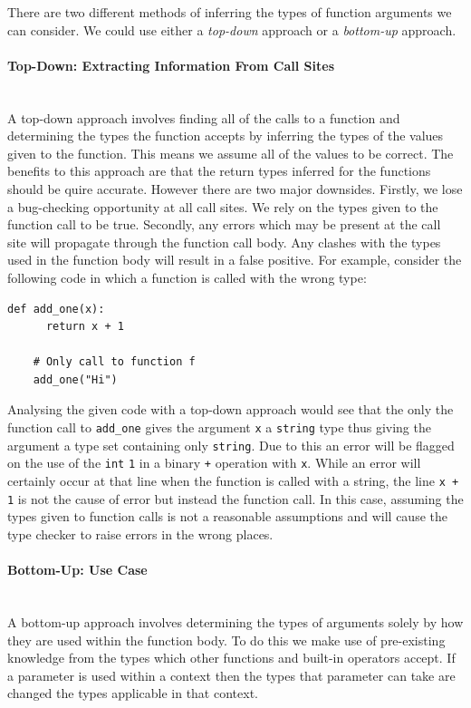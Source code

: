 \documentclass[12pt, titlepage]{article}
\begin{document}
There are two different methods of inferring the types of function arguments we can consider. We could use either a \textit{top-down} approach or a \textit{bottom-up} approach.

\paragraph*{Top-Down: Extracting Information From Call Sites}\mbox{} \\
A top-down approach involves finding all of the calls to a function and determining the types the function accepts by inferring the types of the values given to the function. This means we assume all of the values to be correct. The benefits to this approach are that the return types inferred for the functions should be quire accurate. However there are two major downsides. Firstly, we lose a bug-checking opportunity at all call sites. We rely on the types given to the function call to be true. Secondly, any errors which may be present at the call site will propagate through the function call body. Any clashes with the types used in the function body will result in a false positive. For example, consider the following code in which a function is called with the wrong type:
\begin{lstlisting}[mathescape]
    def add_one(x):
      return x + 1    	
    	
    # Only call to function f
    add_one("Hi")
\end{lstlisting}
Analysing the given code with a top-down approach would see that the only the function call to \texttt{add\_one} gives the argument \texttt{x} a \texttt{string} type thus giving the argument a type set containing only \texttt{string}. Due to this an error will be flagged on the use of the \texttt{int} \texttt{1} in a binary \texttt{+} operation with \texttt{x}. While an error will certainly occur at that line when the function is called with a string, the line \texttt{x + 1} is not the cause of error but instead the function call. In this case, assuming the types given to function calls is not a reasonable assumptions and will cause the type checker to raise errors in the wrong places.

\paragraph*{Bottom-Up: Use Case}\mbox{} \\
A bottom-up approach involves determining the types of arguments solely by how they are used within the function body. To do this we make use of pre-existing knowledge from the types which other functions and built-in operators accept. If a parameter is used within a context then the types that parameter can take are changed the types applicable in that context. \\
\end{document}
